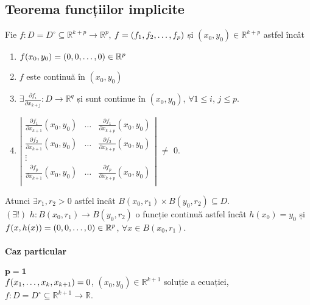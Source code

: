 \subsection{Teorema funcțiilor implicite}
Fie $f:D=D^{\circ} \subseteq \mathbb{R}^{k+p} \rightarrow \mathbb{R}^{p}$, $f = (f_{1}, f_{2}, \mathellipsis, f_{p})$ și $(x_{0}, y_{0}) \in \mathbb{R}^{k+p}$ astfel încât
\begin{enumerate}[label=\emph{\alph*})]
    \item $f(x_{0}, y_{0}) = (0, 0, \mathellipsis, 0) \in \mathbb{R}^{p}$
    \item $f$ este continuă în $(x_{0}, y_{0})$
    \item $\exists \displaystyle\frac{\partial f_{i}}{\partial x_{k+j}}:D \rightarrow \mathbb{R}^{q}$ și sunt continue în $(x_{0}, y_{0})$, $\forall 1 \leq i$, $j \leq p$.
    \item $\left|
           \begin{array}{ccc}
               \displaystyle\frac{\partial f_{1}}{\partial x_{k+1}}(x_{0}, y_{0}) & \ldots & \displaystyle\frac{\partial f_{1}}{\partial x_{k+p}}(x_{0}, y_{0}) \\
               \displaystyle\frac{\partial f_{2}}{\partial x_{k+1}}(x_{0}, y_{0}) & \ldots & \displaystyle\frac{\partial f_{2}}{\partial x_{k+p}}(x_{0}, y_{0}) \\
               \vdots \\
               \displaystyle\frac{\partial f_{p}}{\partial x_{k+1}}(x_{0}, y_{0}) & \ldots & \displaystyle\frac{\partial f_{p}}{\partial x_{k+p}}(x_{0}, y_{0}) \\
           \end{array}
           \right|$ $\neq$ $0$.
\end{enumerate}
Atunci $\exists r_{1}, r_{2} > 0$ astfel încât $B(x_{0}, r_{1}) \times B(y_{0}, r_{2}) \subseteq D$. \\
$(\exists !)$ $h: B(x_{0}, r_{1}) \rightarrow B(y_{0}, r_{2})$ o funcție continuă astfel încât $h(x_{0}) = y_{0}$ și
$f(x, h(x)) = (0,0, \mathellipsis, 0) \in \mathbb{R}^{p}$, $\forall x \in B(x_{0}, r_{1})$.

\paragraph{Caz particular}
$\mathbf{p=1}$ \\
$f(x_{1}, \mathellipsis, x_{k}, x_{k+1}) = 0$, $(x_{0}, y_{0}) \in \mathbb{R}^{k+1}$ soluție a ecuației, $f:D=D^{\circ} \subseteq \mathbb{R}^{k+1} \rightarrow \mathbb{R}$.

